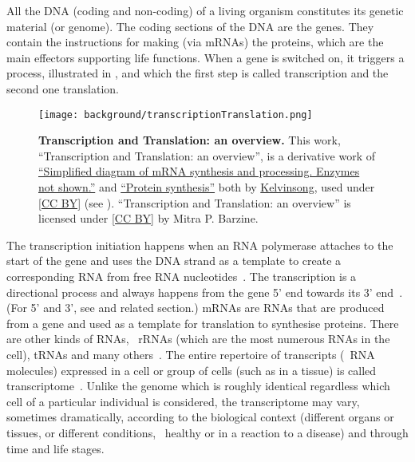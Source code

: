 All the \gls{DNA} (coding and non-coding) of a living organism
constitutes its genetic material (or genome).
The coding sections of the \gls{DNA} are the genes.
They contain the instructions for making (via \glspl{mRNA}) the proteins,
which are the main effectors supporting life functions.
When a gene is switched on,
it triggers a process,
illustrated in ,
and which the first step is called transcription
and the second one translation.~

\begin{figure}[!htpb]
    \vspace{-3mm}
    \texttt{[image: background/transcriptionTranslation.png]}\centering
    \vspace{-2.3mm}
    \caption[Transcription and Translation: an overview]%
    {\label{fig:transcriptionTranslation}\textbf{Transcription and Translation: an overview.}
    {\small This work, \enquote{Transcription and Translation: an overview},
    is a derivative work of
    \href{https://commons.wikimedia.org/wiki/File:MRNA.svg}{\enquote{Simplified diagram of mRNA synthesis and processing. Enzymes not shown.}}
    and
    \href{https://commons.wikimedia.org/wiki/File:Protein\_synthesis.svg}{\enquote{Protein synthesis}}
    both by \href{https://commons.wikimedia.org/wiki/User:Kelvinsong}{Kelvinsong},
    used under \href{https://creativecommons.org/licenses/by/3.0/}{[CC BY]}
    (see ).
    \enquote{Transcription and Translation: an overview} is licensed under
    \href{https://creativecommons.org/licenses/by/4.0/}{[CC BY]} by Mitra P. Barzine.
    }}
\end{figure}

The transcription initiation happens when
an \gls{RNA} polymerase attaches to the start of the gene
and uses the \gls{DNA} strand as a template
to create a corresponding \gls{RNA}
from free \gls{RNA} nucleotides~.
The transcription is a directional process and
always happens from the gene 5' end towards its 3' end~.
(For 5' and 3', see  and related section.)
\glspl{mRNA} are \glspl{RNA} that are produced from a gene
and used as a template for translation to synthesise proteins.
There are other kinds of \glspl{RNA},
\eg\ \glspl{rRNA} (which are the most numerous \glspl{RNA} in the cell),
\glspl{tRNA} and many others~.
The entire repertoire of transcripts (\ie\ \gls{RNA} molecules) expressed
in a cell or group of cells (such as in a tissue)
is called transcriptome~.
Unlike the genome which is roughly identical
regardless which cell of a particular individual is considered,
the transcriptome may vary, sometimes dramatically,
according to the biological context (different organs or tissues,
or different conditions, \eg\ healthy or in a reaction to a disease)
and through time and life stages.~

